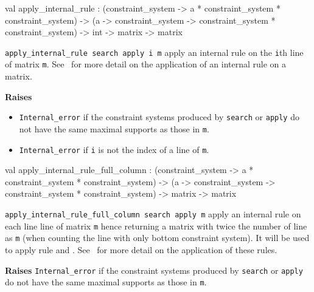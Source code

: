 \label{val:Constraint-underscoresystem.apply-underscoreinternal-underscorerule}\begin{ocamldoccode}
val apply_internal_rule :
  (constraint_system ->
   {\textquotesingle}a * constraint_system *
   constraint_system) ->
  ({\textquotesingle}a ->
   constraint_system ->
   constraint_system * constraint_system) ->
  int -> matrix -> matrix
\end{ocamldoccode}
\begin{ocamldocdescription}
{\tt{apply\_internal\_rule search apply i m}} apply an internal rule on the {\tt{i}}th line of matrix {\tt{m}}. 
    See~ for more detail on the application of an internal rule on a matrix. 

{\bf Raises} \begin{itemize}
\item {\tt{Internal\_error}} if the constraint systems produced by {\tt{search}} or {\tt{apply}} 
    do not have the same maximal supports as those in {\tt{m}}.
\item {\tt{Internal\_error}} if {\tt{i}} is not the index of a line of {\tt{m}}.
\end{itemize}



\end{ocamldocdescription}




\label{val:Constraint-underscoresystem.apply-underscoreinternal-underscorerule-underscorefull-underscorecolumn}\begin{ocamldoccode}
val apply_internal_rule_full_column :
  (constraint_system ->
   {\textquotesingle}a * constraint_system *
   constraint_system) ->
  ({\textquotesingle}a ->
   constraint_system ->
   constraint_system * constraint_system) ->
  matrix -> matrix
\end{ocamldoccode}
\begin{ocamldocdescription}
{\tt{apply\_internal\_rule\_full\_column search apply m}} apply an internal rule on each line line of matrix {\tt{m}} hence
    returning a matrix with twice the number of line as {\tt{m}} (when counting the line with only bottom constraint system). 
    It will be used to apply rule \Dest and \Eqlr .
    See~ for more detail on the application of these rules. 

{\bf Raises} {\tt{Internal\_error}} if the constraint systems produced by {\tt{search}} or {\tt{apply}} 
    do not have the same maximal supports as those in {\tt{m}}.


\end{ocamldocdescription}


